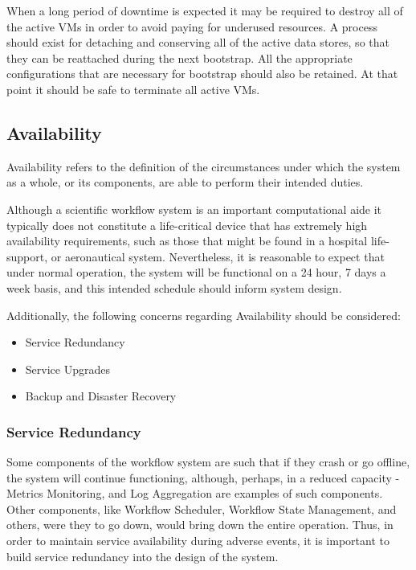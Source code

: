 When a long period of downtime is expected it may be required to destroy all of the active VMs in order to avoid paying for underused resources. A process should exist for detaching and conserving all of the active data stores, so that they can be reattached during the next bootstrap. All the appropriate configurations that are necessary for bootstrap should also be retained. At that point it should be safe to terminate all active VMs. 

\subsection {Availability} \label{sec:availability}

Availability refers to the definition of the circumstances under which the system as a whole, or its components, are able to perform their intended duties.

Although a scientific workflow system is an important computational aide it typically does not constitute a life-critical device that has extremely high availability requirements, such as those that might be found in a hospital life-support, or aeronautical system. Nevertheless, it is reasonable to expect that under normal operation, the system will be functional on a 24 hour, 7 days a week basis, and this intended schedule should inform system design.

Additionally, the following concerns regarding Availability should be considered:

\begin{itemize}
\item Service Redundancy
\item Service Upgrades
\item Backup and Disaster Recovery
\end{itemize}

\subsubsection {Service Redundancy}

Some components of the workflow system are such that if they crash or go offline, the system will continue functioning, although, perhaps, in a reduced capacity - Metrics Monitoring, and Log Aggregation are examples of such components. Other components, like Workflow Scheduler, Workflow State Management, and others, were they to go down, would bring down the entire operation. Thus, in order to maintain service availability during adverse events, it is important to build service redundancy into the design of the system.

